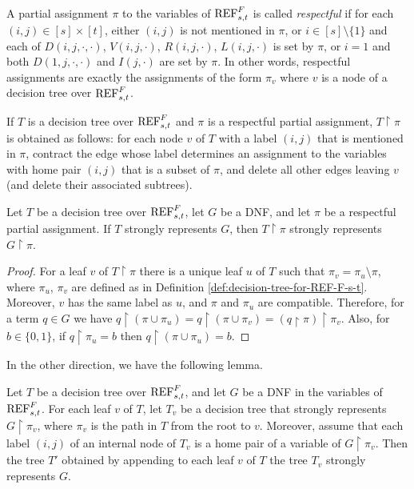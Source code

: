 \begin{definition}
A partial assignment $\pi$ to the variables of $\textnormal{REF}^{F}_{s,t}$ is called \emph{respectful} if for each $(i,j) \in [s] \times [t]$, either $(i,j)$ is not mentioned in $\pi$, or $i \in [s]\! \setminus \! \{1\}$ and each of $D(i,j,\cdot, \cdot)$, $V(i,j, \cdot)$, $R(i,j, \cdot)$, $L(i,j, \cdot)$ is set by $\pi$, or $i=1$ and both $D(1,j,\cdot, \cdot)$ and $I(j, \cdot)$ are set by $\pi$. In other words, respectful assignments are exactly the assignments of the form $\pi_v$ where $v$ is a node of a decision tree over $\textnormal{REF}^{F}_{s,t}$.

If $T$ is a decision tree over $\textnormal{REF}^{F}_{s,t}$ and $\pi$ is a respectful partial assignment, $T \! \restriction \! \pi$ is obtained as follows: for each node $v$ of $T$ with a label $(i,j)$ that is mentioned in $\pi$, contract the edge whose label determines an assignment to the variables with home pair $(i,j)$ that is a subset of $\pi$, and delete all other edges leaving $v$ (and delete their associated subtrees).
\end{definition}

\begin{lemma}
\label{lem:decision_tree_restriction_by_respectful}
Let $T$ be a decision tree over $\textnormal{REF}^{F}_{s,t}$, let $G$ be a DNF, and let $\pi$ be a respectful partial assignment. If $T$ strongly represents $G$, then $T \! \restriction \! \pi$ strongly represents $G \! \restriction \! \pi$.
\end{lemma}

\begin{proof}
For a leaf $v$ of $T \! \restriction \! \pi$ there is a unique leaf $u$ of $T$ such that $\pi_v = \pi_u \setminus \pi$, where $\pi_u$, $\pi_v$ are defined as in Definition \ref{def:decision-tree-for-REF-F-s-t}. Moreover, $v$ has the same label as $u$, and $\pi$ and $\pi_u$ are compatible. Therefore, for a term $q \in G$ we have $q \! \restriction \! (\pi \cup \pi_u) = q \! \restriction \! (\pi \cup \pi_v) = (q \! \restriction \! \pi) \! \restriction \! \pi_v$. Also, for $b \in \{0,1\}$, if $q \! \restriction \! \pi_u = b$ then $q \! \restriction \! (\pi \cup \pi_u) = b$.
\end{proof}

In the other direction, we have the following lemma.

\begin{lemma}
\label{lem:decision_tree_composition}
Let $T$ be a decision tree over $\textnormal{REF}^{F}_{s,t}$, and let $G$ be a DNF in the variables of $\textnormal{REF}^{F}_{s,t}$. For each leaf $v$ of $T$, let $T_v$ be a decision tree that strongly represents $G \! \restriction \! \pi_v$, where $\pi_v$ is the path in $T$ from the root to $v$. Moreover, assume that each label $(i,j)$ of an internal node of $T_v$ is a home pair of a variable of $G \! \restriction \! \pi_v$. Then the tree $T'$ obtained by appending to each leaf $v$ of $T$ the tree $T_v$ strongly represents $G$.
\end{lemma}

